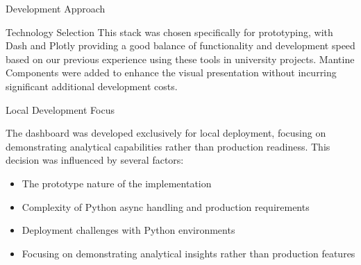 \begin{section}{Development Approach}
\begin{subsection}{Technology Selection}
		This stack was chosen specifically for prototyping, with Dash and Plotly providing a good balance of functionality and development speed based on our previous experience using these tools in university projects.
		Mantine Components were added to enhance the visual presentation without incurring significant additional development costs.

	\end{subsection}

	\begin{subsection}{Local Development Focus}
		\label{subsec:implementation-development-approach-local}

		The dashboard was developed exclusively for local deployment, focusing on demonstrating analytical capabilities rather than production readiness.
		This decision was influenced by several factors:

		\begin{itemize}
			\item The prototype nature of the implementation
			\item Complexity of Python async handling and production requirements
			\item Deployment challenges with Python environments
			\item Focusing on demonstrating analytical insights rather than production features
		\end{itemize}

	\end{subsection}
\end{section}

